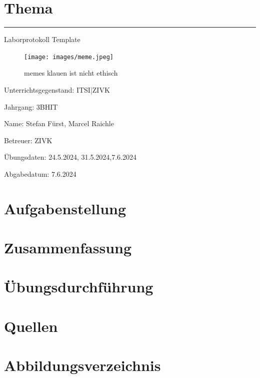 \documentclass[a4paper]{article}
\begin{document}

\pagestyle{oida}
\section*{Thema}
\par\noindent\rule{\textwidth}{0.4pt}

Laborprotokoll
Template

\begin{figure}[h]
	\texttt{[image: images/meme.jpeg]}
	\caption{memes klauen ist nicht ethisch}
\end{figure}

\vspace*{\fill}
Unterrichtsgegenstand:	ITSI|ZIVK

Jahrgang:	3BHIT

Name:	Stefan Fürst, Marcel Raichle

Betreuer: 	ZIVK

Übungsdaten:	24.5.2024, 31.5.2024,7.6.2024

Abgabedatum:	7.6.2024


\newpage
\tableofcontents

\newpage

\section{Aufgabenstellung}



\section{Zusammenfassung}


\newpage

\section{Übungsdurchführung}


\newpage
\section{Quellen}

\newpage
\section{Abbildungsverzeichnis}

\listoffigures
\end{document}
